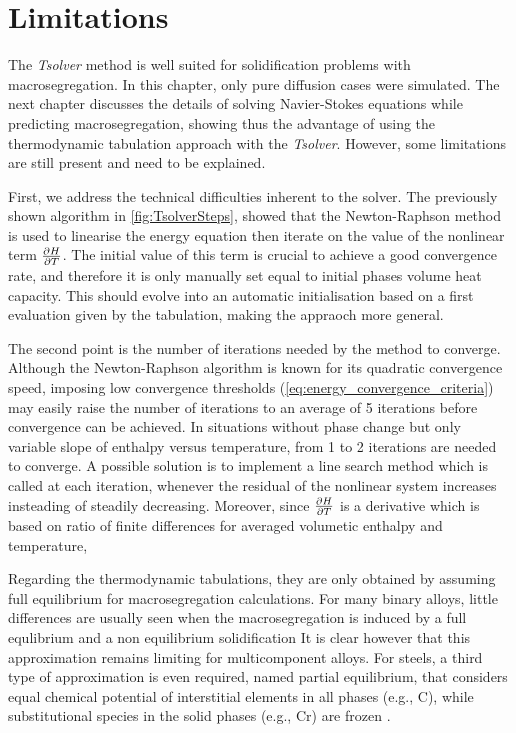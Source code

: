 \section{Limitations}

The \emph{Tsolver} method is well suited for 
solidification problems with macrosegregation. In this chapter, only pure diffusion cases were simulated. 
The next chapter discusses the details of solving Navier-Stokes equations while predicting macrosegregation, 
showing thus the advantage of using the thermodynamic tabulation approach with the \emph{Tsolver}.
However, some limitations are still present and need to be explained.

First, we address the technical difficulties inherent to the solver. The previously shown algorithm in \cref{fig:TsolverSteps},
showed that the Newton-Raphson method is used to linearise the energy equation then iterate on the value of the nonlinear
term $\frac{\partial H}{\partial T}$. The initial value of this term is crucial to achieve a good convergence rate, and therefore it is only manually set equal 
to initial phases volume heat capacity. This should evolve into an automatic initialisation based on a first evaluation given by the tabulation,
making the appraoch more general. 

The second point is the number of iterations needed by the method to converge.
Although the Newton-Raphson algorithm is known for its quadratic convergence speed, imposing low convergence thresholds (\cref{eq:energy_convergence_criteria}) 
may easily raise the number of iterations to an average of 5 iterations before convergence can be achieved. In situations without
phase change but only variable slope of enthalpy versus temperature, from 1 to 2 iterations are needed to converge.
A possible solution is to implement a line search method which is called at each iteration, whenever the residual of the nonlinear
system increases insteading of steadily decreasing. Moreover, since $\frac{\partial H}{\partial T}$ is a derivative which is based on ratio of finite differences for
 averaged volumetic enthalpy and temperature, 


Regarding the thermodynamic tabulations, they are only obtained by assuming full equilibrium for macrosegregation calculations. 
For many binary alloys, little differences are usually seen when the macrosegregation is induced by a full equlibrium and a non equilibrium solidification
It is clear however that this approximation remains limiting for multicomponent alloys. 
For steels, a third type of approximation is even required, named partial equilibrium, that considers equal chemical potential 
of interstitial elements in all phases (e.g., C), while substitutional species in the solid phases (e.g., Cr) are frozen \citep{koshikawa_computation_2014}. 




